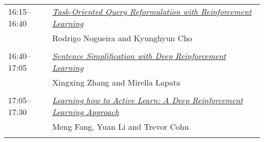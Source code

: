 \begin{tabular}{p{20mm}p{128mm}}
16:15--16:40 & \hyperlink{page.583}{\em Task-Oriented Query Reformulation with Reinforcement Learning}\\
         & Rodrigo Nogueira and Kyunghyun Cho \\
\\

16:40--17:05 & \hyperlink{page.593}{\em Sentence Simplification with Deep Reinforcement Learning}\\
         & Xingxing Zhang and Mirella Lapata \\
\\

17:05--17:30 & \hyperlink{page.604}{\em Learning how to Active Learn: A Deep Reinforcement Learning Approach}\\
         & Meng Fang, Yuan Li and Trevor Cohn \\
\\

\end{tabular}
\newpage
